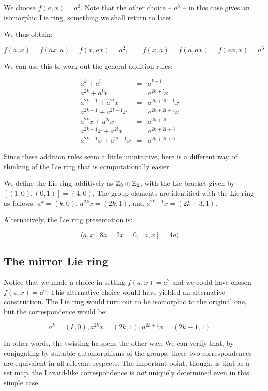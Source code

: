 \documentclass[10pt]{amsart}
\begin{document}
We choose $f(a,x) = a^2$. Note that the other choice -- $a^6$ -- in
this case gives an isomorphic Lie ring, something we shall return to
later.

We thus obtain:

$$f(a,x) = f(ax,a) = f(x,ax) = a^2, \qquad f(x,a) = f(a,ax) = f(ax,x) = a^6$$

We can use this to work out the general addition rules:

\begin{eqnarray*}
  a^k + a^l & = & a^{k+l}\\
  a^{2k} + a^lx & = & a^{2k+l}x\\
  a^{2k+1} + a^{2l}x & = & a^{2k + 2l-1}x\\
  a^{2k+1} + a^{2l+1}x & = & a^{2k + 2l + 4}x\\
  a^{2k}x + a^{2l}x & = & a^{2k + 2l}\\
  a^{2k+1}x + a^{2l}x & = & a^{2k+2l+3}\\
  a^{2k+1}x + a^{2l+1}x & = & a^{2k+2l+6}
\end{eqnarray*}

Since these addition rules seem a little unintuitive, here is a
different way of thinking of the Lie ring that is computationally
easier. 

We define the Lie ring additively as $\mathbb{Z}_8 \oplus \mathbb{Z}_2$, with the Lie
bracket given by $[(1,0),(0,1)] = (4,0)$. The group elements are
identified with the Lie ring as follows: $a^k = (k,0)$, $a^{2k}x =
(2k,1)$, and $a^{2k+1}x = (2k+3,1)$.

Alternatively, the Lie ring presentation is:

$$\langle a,x \mid 8a = 2x = 0, [a,x] = 4a \rangle$$

\subsection{The mirror Lie ring}

Notice that we made a choice in setting $f(a,x) = a^2$ and we could
have chosen $f(a,x) = a^6$. This alternative choice would have yielded
an alternative construction. The Lie ring would turn out to be
isomorphic to the original one, but the correspondence would be:

$$a^k = (k,0), a^{2k}x = (2k,1), a^{2k+1}x = (2k-1,1)$$

In other words, the twisting happens the other way. We can verify
that, by conjugating by suitable automorphisms of the groups, these
two correspondences are equivalent in all relevant respects. The
important point, though, is that as a set map, the Lazard-like
correspondence is {\em not} uniquely determined even in this simple
case.
\end{document}
